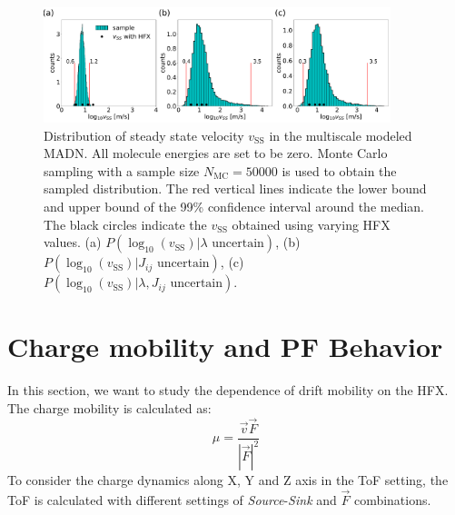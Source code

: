 \documentclass[letterpaper,12pt]{article}
\begin{document}
\begin{figure}[H]
    \centering
    \includegraphics[width=0.90\textwidth]{figs/fig_mle_MADN_noE_SS.pdf}
    \caption{Distribution of steady state velocity $v_\text{SS}$ in the multiscale modeled MADN. All molecule energies are set to be zero.  
    Monte Carlo sampling with a sample size $N_\text{MC}=50000$ is used to obtain the sampled distribution.
    The red vertical lines indicate the lower bound and upper bound of the 99\% confidence interval around the median.
    The black circles indicate the $v_\text{SS}$ obtained using varying HFX values.
    (a) $P(\log_{10}(v_\text{SS})|\lambda \text{ uncertain})$, 
    (b) $P(\log_{10}(v_\text{SS})|J_{ij} \text{ uncertain})$, 
    (c) $P(\log_{10}(v_\text{SS})|\lambda, J_{ij} \text{ uncertain})$.  }
    \label{fig:mle_MADN_noE_SS}
\end{figure}

\section{Charge mobility and PF Behavior}
In this section, we want to study the dependence of drift mobility on the HFX. The charge mobility is calculated as:
\begin{equation}
    \mu = \frac{\vec{v} \vec{F} }{ |\vec{F}|^2}
    \label{eq:mu}
\end{equation}
To consider the charge dynamics along X, Y and Z axis in the ToF setting, the ToF is calculated with different settings of \textit{Source}-\textit{Sink} and $\vec{F}$ combinations.
\end{document}
